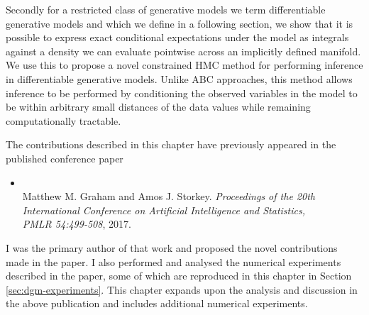 Secondly for a restricted class of generative models we term differentiable generative models and which we define in a following section, we show that it is possible to express exact conditional expectations under the model as integrals against a density we can evaluate pointwise across an implicitly defined manifold. We use this to propose a novel constrained \ac{HMC} method for performing inference in differentiable generative models. Unlike \ac{ABC} approaches, this method allows inference to be performed by conditioning the observed variables in the model to be within arbitrary small distances of the data values while remaining computationally tractable.

The contributions described in this chapter have previously appeared in the published conference paper
\begin{itemize}
 \item {}\\ Matthew M. Graham and Amos J. Storkey. \emph{Proceedings of the 20th International Conference on Artificial Intelligence and Statistics, \\PMLR 54:499-508}, 2017.
\end{itemize}
I was the primary author of that work and proposed the novel contributions made in the paper. I also performed and analysed the numerical experiments described in the paper, some of which are reproduced in this chapter in Section \ref{sec:dgm-experiments}. This chapter expands upon the analysis and discussion in the above publication and includes additional numerical experiments.





